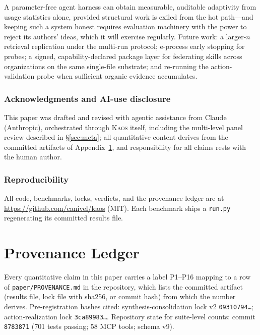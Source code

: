 \documentclass[11pt]{article}
\newcommand{\kaos}{\textsc{Kaos}}
\begin{document}
A parameter-free agent harness can obtain measurable, auditable adaptivity from usage statistics alone, provided structural work is exiled from the hot path---and keeping such a system honest requires evaluation machinery with the power to reject its authors' ideas, which it will exercise regularly. Future work: a larger-$n$ retrieval replication under the multi-run protocol; e-process early stopping for probes; a signed, capability-declared package layer for federating skills across organizations on the same single-file substrate; and re-running the action-validation probe when sufficient organic evidence accumulates.

\subsubsection*{Acknowledgments and AI-use disclosure}
This paper was drafted and revised with agentic assistance from Claude (Anthropic), orchestrated through \kaos{} itself, including the multi-level panel review described in \S\ref{sec:meta}; all quantitative content derives from the committed artifacts of Appendix~\ref{app:provenance}, and responsibility for all claims rests with the human author.

\subsubsection*{Reproducibility}
All code, benchmarks, locks, verdicts, and the provenance ledger are at \url{https://github.com/canivel/kaos} (MIT). Each benchmark ships a \texttt{run.py} regenerating its committed results file.




\appendix

\section{Provenance Ledger}
\label{app:provenance}

Every quantitative claim in this paper carries a label P1--P16 mapping to a row of \texttt{paper/PROVENANCE.md} in the repository, which lists the committed artifact (results file, lock file with sha256, or commit hash) from which the number derives. Pre-registration hashes cited: synthesis-consolidation lock v2 \texttt{09310794\ldots}; action-realization lock \texttt{3ca89983\ldots}. Repository state for suite-level counts: commit \texttt{8783871} (701 tests passing; 58 MCP tools; schema v9).
\end{document}
